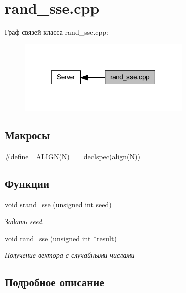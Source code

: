 \hypertarget{group__rand__ssecpp}{}\section{rand\+\_\+sse.\+cpp}
\label{group__rand__ssecpp}
Граф связей класса rand\+\_\+sse.\+cpp\+:\nopagebreak
\begin{figure}[H]
\begin{center}
\leavevmode
\includegraphics[width=235pt]{group__rand__ssecpp}
\end{center}
\end{figure}
\subsection*{Макросы}
\begin{DoxyCompactItemize}
\item 
\#define \mbox{\hyperlink{group__rand__ssecpp_gae2c66d1d7db5adf0c1853960e2be1119}{\+\_\+\+A\+L\+I\+GN}}(N)~\+\_\+\+\_\+declspec(align(N))
\end{DoxyCompactItemize}
\subsection*{Функции}
\begin{DoxyCompactItemize}
\item 
void \mbox{\hyperlink{group__rand__ssecpp_ga80db1a2aa7de7edf52b9c60e101d556f}{srand\+\_\+sse}} (unsigned int seed)
\begin{DoxyCompactList}\small\item\em Задать seed. \end{DoxyCompactList}\item 
void \mbox{\hyperlink{group__rand__ssecpp_gab7ae3ab6c8fb3e31548413dd0154db7d}{rand\+\_\+sse}} (unsigned int $\ast$result)
\begin{DoxyCompactList}\small\item\em Получение вектора с случайными числами \end{DoxyCompactList}\end{DoxyCompactItemize}


\subsection{Подробное описание}


